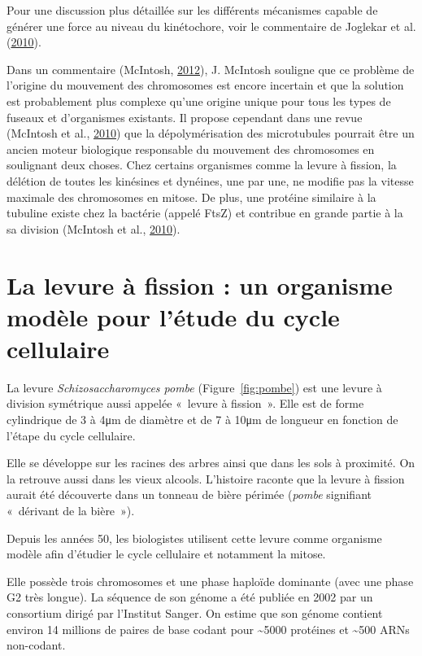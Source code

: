 \documentclass[12pt,a4paper,twoside,openright]{book}
\begin{document}
Pour une discussion plus détaillée sur les différents mécanismes capable
de générer une force au niveau du kinétochore, voir le commentaire de
Joglekar et al. (\protect\hyperlink{ref-Joglekar2010a}{2010}).

Dans un commentaire (McIntosh,
\protect\hyperlink{ref-McIntosh2012}{2012}), J. McIntosh souligne que ce
problème de l'origine du mouvement des chromosomes est encore incertain
et que la solution est probablement plus complexe qu'une origine unique
pour tous les types de fuseaux et d'organismes existants. Il propose
cependant dans une revue (McIntosh et al.,
\protect\hyperlink{ref-McIntosh2010}{2010}) que la dépolymérisation des
microtubules pourrait être un ancien moteur biologique responsable du
mouvement des chromosomes en soulignant deux choses. Chez certains
organismes comme la levure à fission, la délétion de toutes les
kinésines et dynéines, une par une, ne modifie pas la vitesse maximale
des chromosomes en mitose. De plus, une protéine similaire à la tubuline
existe chez la bactérie (appelé FtsZ) et contribue en grande partie à la
sa division (McIntosh et al.,
\protect\hyperlink{ref-McIntosh2010}{2010}).

\section{La levure à fission : un organisme modèle pour l'étude du cycle
cellulaire}\label{la-levure-uxe0-fission-un-organisme-moduxe8le-pour-luxe9tude-du-cycle-cellulaire}

La levure \emph{Schizosaccharomyces pombe} (Figure~\ref{fig:pombe}) est
une levure à division symétrique aussi appelée «~levure à fission~».
Elle est de forme cylindrique de 3 à 4μm de diamètre et de 7 à 10μm de
longueur en fonction de l'étape du cycle cellulaire.

Elle se développe sur les racines des arbres ainsi que dans les sols à
proximité. On la retrouve aussi dans les vieux alcools. L'histoire
raconte que la levure à fission aurait été découverte dans un tonneau de
bière périmée (\emph{pombe} signifiant «~dérivant de la bière~»).

Depuis les années 50, les biologistes utilisent cette levure comme
organisme modèle afin d'étudier le cycle cellulaire et notamment la
mitose.

Elle possède trois chromosomes et une phase haploïde dominante (avec une
phase G2 très longue). La séquence de son génome a été publiée en 2002
par un consortium dirigé par l'Institut Sanger. On estime que son génome
contient environ 14 millions de paires de base codant pour
\textasciitilde{}5000 protéines et \textasciitilde{}500 ARNs non-codant.
\end{document}
